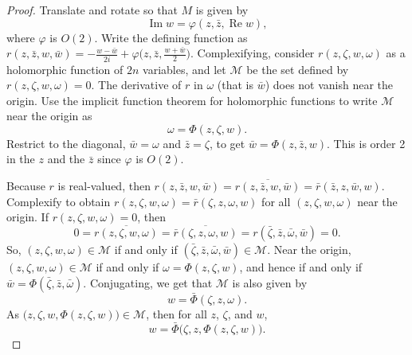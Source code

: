 \documentclass[12pt,openany]{book}
\renewcommand{\Re}{\operatorname{Re}}
\renewcommand{\Im}{\operatorname{Im}}
\newcommand{\sM}{{\mathscr{M}}}
\theoremstyle{plain}
\theoremstyle{remark}
\theoremstyle{definition}
\theoremstyle{exercise}
\theoremstyle{example}
\begin{document}
\begin{proof}
Translate and rotate so that $M$ is given by
\begin{equation*}
\Im w = \varphi(z,\bar{z},\Re w) ,
\end{equation*}
where $\varphi$ is $O(2)$.
Write the defining function
as $r(z,\bar{z},w,\bar{w}) = -\frac{w-\bar{w}}{2i}
+\varphi\bigl(z,\bar{z},\frac{w+\bar{w}}{2}\bigr)$.
Complexifying, consider
$r(z,\zeta,w,\omega)$ as
a holomorphic function of $2n$ variables,
and let $\sM$ be the set defined by
$r(z,\zeta,w,\omega) = 0$.
The derivative of $r$ in
$\omega$ (that is $\bar{w}$) does not vanish near the origin.
Use the implicit function theorem for holomorphic functions to write $\sM$
near the origin as
\begin{equation*}
\omega = \Phi(z,\zeta,w) .
\end{equation*}
Restrict to the diagonal, $\bar{w} = \omega$ and $\bar{z}=\zeta$,
to get
$\bar{w} = \Phi(z,\bar{z},w)$.  This is order 2 in the $z$ and the $\bar{z}$
since $\varphi$ is $O(2)$.

Because $r$ is real-valued, then
$r(z,\bar{z},w,\bar{w}) =
\overline{r(z,\bar{z},w,\bar{w})} = \bar{r}(\bar{z},z,\bar{w},w)$.
Complexify to obtain
$r(z,\zeta,w,\omega) =
\bar{r}(\zeta,z,\omega,w)$ for all $(z,\zeta,w,\omega)$ near the origin.
If $r(z,\zeta,w,\omega) = 0$,
then 
\begin{equation*}
0 = \overline{r(z,\zeta,w,\omega)} =
\overline{\bar{r}(\zeta,z,\omega,w)} =
r(\bar{\zeta},\bar{z},\bar{\omega},\bar{w}) =0.
\end{equation*}
So,
$(z,\zeta,w,\omega) \in \sM$
if and only if
$(\bar{\zeta},\bar{z},\bar{\omega},\bar{w}) \in \sM$.
Near the origin,
$(z,\zeta,w,\omega) \in \sM$ if and only if
$\omega = \Phi(z,\zeta,w)$, and hence
if and only if
$\bar{w} = \Phi(\bar{\zeta},\bar{z},\bar{\omega})$.
Conjugating, we get that $\sM$ is also given by
\begin{equation*}
w = \bar{\Phi}(\zeta,z,\omega).
\end{equation*}
As $\bigl(z,\zeta,w,\Phi(z,\zeta,w)\bigr) \in \sM$, then
for all $z$, $\zeta$, and $w$,
\begin{equation*}
w = \bar{\Phi}\bigl(\zeta,z,\Phi(z,\zeta,w)\bigr).
\end{equation*}


\end{proof}
\end{document}
